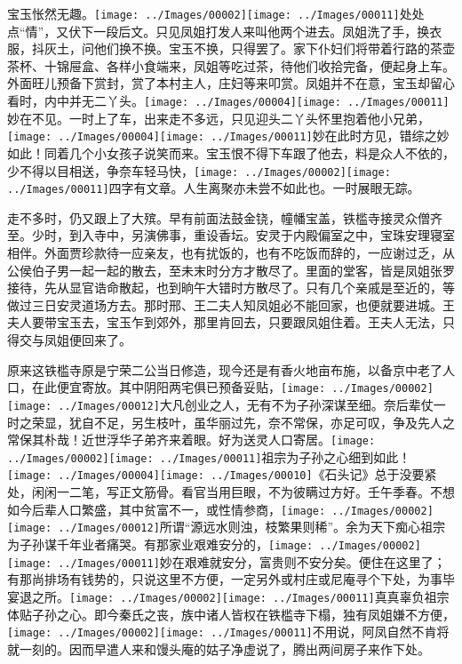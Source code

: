 宝玉怅然无趣。{\texttt{[image: ../Images/00002]}\texttt{[image: ../Images/00011]}\footnotesize \kaishu 处处点``情''，又伏下一段后文。}只见凤姐打发人来叫他两个进去。凤姐洗了手，换衣服，抖灰土，问他们换不换。宝玉不换，只得罢了。家下仆妇们将带着行路的茶壶茶杯、十锦屉盒、各样小食端来，凤姐等吃过茶，待他们收拾完备，便起身上车。外面旺儿预备下赏封，赏了本村主人，庄妇等来叩赏。凤姐并不在意，宝玉却留心看时，内中并无二丫头。{\texttt{[image: ../Images/00004]}\texttt{[image: ../Images/00011]}\footnotesize \kaishu 妙在不见。}一时上了车，出来走不多远，只见迎头二丫头怀里抱着他小兄弟，{\texttt{[image: ../Images/00004]}\texttt{[image: ../Images/00011]}\footnotesize \kaishu 妙在此时方见，错综之妙如此！}同着几个小女孩子说笑而来。宝玉恨不得下车跟了他去，料是众人不依的，少不得以目相送，争奈车轻马快，{\texttt{[image: ../Images/00002]}\texttt{[image: ../Images/00011]}\footnotesize \kaishu 四字有文章。人生离聚亦未尝不如此也。}一时展眼无踪。

走不多时，仍又跟上了大殡。早有前面法鼓金铙，幢幡宝盖，铁槛寺接灵众僧齐至。少时，到入寺中，另演佛事，重设香坛。安灵于内殿偏室之中，宝珠安理寝室相伴。外面贾珍款待一应亲友，也有扰饭的，也有不吃饭而辞的，一应谢过乏，从公侯伯子男一起一起的散去，至未末时分方才散尽了。里面的堂客，皆是凤姐张罗接待，先从显官诰命散起，也到晌午大错时方散尽了。只有几个亲戚是至近的，等做过三日安灵道场方去。那时邢、王二夫人知凤姐必不能回家，也便就要进城。王夫人要带宝玉去，宝玉乍到郊外，那里肯回去，只要跟凤姐住着。王夫人无法，只得交与凤姐便回来了。

原来这铁槛寺原是宁荣二公当日修造，现今还是有香火地亩布施，以备京中老了人口，在此便宜寄放。其中阴阳两宅俱已预备妥贴，{\texttt{[image: ../Images/00002]}\texttt{[image: ../Images/00012]}\footnotesize \kaishu 大凡创业之人，无有不为子孙深谋至细。奈后辈仗一时之荣显，犹自不足，另生枝叶，虽华丽过先，奈不常保，亦足可叹，争及先人之常保其朴哉！近世浮华子弟齐来着眼。}好为送灵人口寄居。{\texttt{[image: ../Images/00002]}\texttt{[image: ../Images/00011]}\footnotesize \kaishu 祖宗为子孙之心细到如此！　\texttt{[image: ../Images/00004]}\texttt{[image: ../Images/00010]}\footnotesize \kaishu 《石头记》总于没要紧处，闲闲一二笔，写正文筋骨。看官当用巨眼，不为彼瞒过方好。壬午季春。}不想如今后辈人口繁盛，其中贫富不一，或性情参商，{\texttt{[image: ../Images/00002]}\texttt{[image: ../Images/00012]}\footnotesize \kaishu 所谓``源远水则浊，枝繁果则稀''。余为天下痴心祖宗为子孙谋千年业者痛哭。}有那家业艰难安分的，{\texttt{[image: ../Images/00002]}\texttt{[image: ../Images/00011]}\footnotesize \kaishu 妙在艰难就安分，富贵则不安分矣。}便住在这里了；有那尚排场有钱势的，只说这里不方便，一定另外或村庄或尼庵寻个下处，为事毕宴退之所。{\texttt{[image: ../Images/00002]}\texttt{[image: ../Images/00011]}\footnotesize \kaishu 真真辜负祖宗体贴子孙之心。}即今秦氏之丧，族中诸人皆权在铁槛寺下榻，独有凤姐嫌不方便，{\texttt{[image: ../Images/00002]}\texttt{[image: ../Images/00011]}\footnotesize \kaishu 不用说，阿凤自然不肯将就一刻的。}因而早遣人来和馒头庵的姑子净虚说了，腾出两间房子来作下处。

